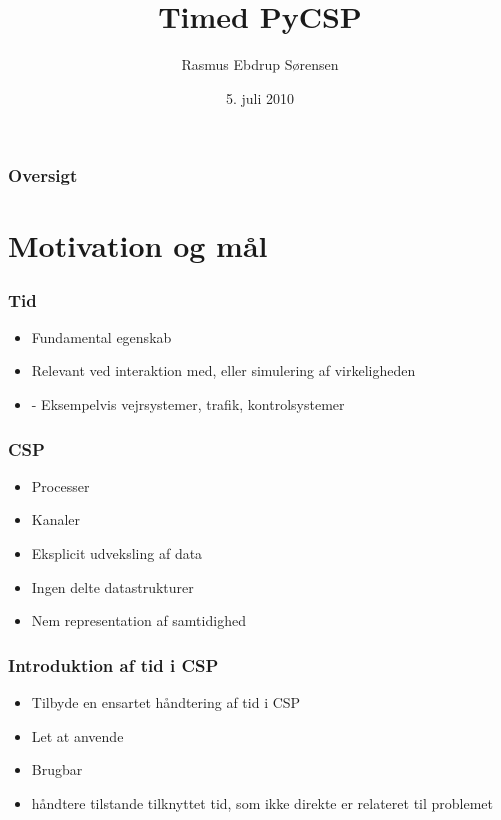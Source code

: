 \documentclass[12pt]{beamer}
\title
{Timed PyCSP}
\institute
{Datalogisk Institut \\ Københavns Universitet}
\author
{Rasmus Ebdrup Sørensen}
\date
{5. juli 2010}
\begin{document}
\frame[plain]\titlepage

\begin{frame}
  \frametitle{Oversigt}
  \tableofcontents
\end{frame}

\section{Motivation og mål}
\begin{frame}
  \frametitle{Tid}
  \begin{itemize}
	\item Fundamental egenskab
	\item Relevant ved interaktion med, eller simulering af virkeligheden
	\item - Eksempelvis vejrsystemer, trafik, kontrolsystemer 
  \end{itemize}
\end{frame}

\begin{frame}
  \frametitle{CSP}
  \begin{itemize}
	\item Processer
  \item Kanaler
	\item Eksplicit udveksling af data
	\item Ingen delte datastrukturer
  \item Nem representation af samtidighed
 \end{itemize}
\end{frame}

\begin{frame}
  \frametitle{Introduktion af tid i CSP}
  \begin{itemize}
	\item Tilbyde en ensartet håndtering af tid i CSP
	\item Let at anvende
	\item Brugbar
	\item håndtere tilstande tilknyttet tid, som ikke direkte er relateret til problemet
  \end{itemize}
\end{frame}
\end{document}
